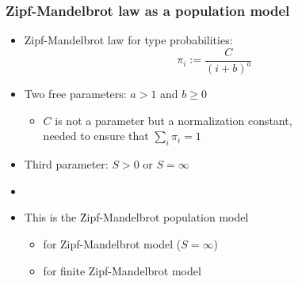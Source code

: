 \documentclass[t]{beamer} %
\begin{document}
\begin{frame}
  \frametitle{Zipf-Mandelbrot law as a population model}

  \begin{itemize}
  \item Zipf-Mandelbrot law for type probabilities:
    \[ \pi_i := \frac{C}{(i + b) ^ a} \]
  \item<2-> Two free parameters: $a > 1$ and $b \geq 0$
    \begin{itemize}
    \item[\hand] $C$ is not a parameter but a normalization constant,\\
      needed to ensure that $\sum_i \pi_i = 1$
    \end{itemize}
  \item<3-> Third parameter: $S > 0$ or $S = \infty$
  \item[]
  \item<4-> This is the \h{Zipf-Mandelbrot} population model \citep{Evert:04}
    \begin{itemize}
    \item {} for Zipf-Mandelbrot model ($S = \infty$)
    \item {} for finite Zipf-Mandelbrot model
    \end{itemize}
  \end{itemize}
\end{frame}
\end{document}
